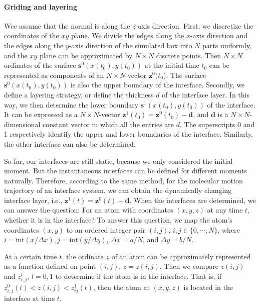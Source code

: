 {\paragraph{Griding and layering}
Wee assume that the normal is along the $z$-axis direction. 
First, we  discretize the coordinates of the $xy$ plane. 
We divide the edges along the $x$-axis direction and the edges along the $y$-axis direction of the simulated box into $N$ parts uniformly, 
and the $xy$ plane can be approximated by $N\times N$ discrete points. 
Then $N\times N$ ordinates of the surface ${\mathbf s}^0(x(t_0),y(t_0))$ at the initial time $t_0$ can be represented as components of an $N\times N$-vector ${\mathbf z}^0(t_0$). 
The surface ${\mathbf s}^0(x(t_0),y(t_0))$ is also the upper boundary of the interface.
Secondly, we define a layering strategy, or define the thickness $d$ of the interface layer. 
In this way, we then determine the lower boundary ${\mathbf s}^1(x(t_0),y(t_0))$ of the interface. 
It can be expressed as a $N\times N$-vector ${\mathbf z}^1(t_0)={\mathbf z}^0(t_0)-{\mathbf d}$, and ${\mathbf d}$ is a $N\times N$-dimensional constant 
vector in which all the entries are $d$. The superscripts 0 and 1 respectively identify the upper and lower boundaries of the interface. 
Similarly, the other interface can also be determined.

So far, our interfaces are still static, because we only considered the initial moment. 
But the instantaneous interfaces can be defined for different moments naturally. 
Therefore, according to the same method, for the molecular motion trajectory of an interface system, 
we can obtain the dynamically changing interface layer, i.e., ${\mathbf z}^1(t)={\mathbf z}^0(t)-{\mathbf d}$. 
When the interfaces are determined, we can answer the question: For an atom with coordinates $(x, y, z)$ at any time $t$, whether it is in the interface?
To answer this question, we map the atom's coordinates $(x, y)$ to an ordered integer pair $(i, j)$, $i,j \in  \{0,\cdots,N\}$, 
where $i = \text{int}(x /\Delta x), j = \text{int}(y/\Delta y)$, $\Delta x = a/N$, and $\Delta y = b/N$.
 
At a certain time $t$, the ordinate $z$ of an atom can be approximately represented as a function defined on point $(i, j)$, $z=z(i,j)$. 
Then we compare $z(i,j)$ and $z^l_{i,j}$, $l=0,1$ to determine if the atom is in the interface. 
That is, if $z^0_{i,j}(t)<z(i,j)<z^1_{ij}(t)$, then the atom at $(x,y,z)$ is located in the interface at time $t$.

}
